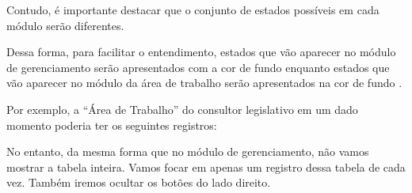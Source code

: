 \begin{landscape}
	Contudo, é importante destacar que o conjunto de estados possíveis em cada módulo serão diferentes.
	
	Dessa forma, para facilitar o entendimento, estados que vão aparecer no módulo de gerenciamento serão apresentados com a cor de fundo  enquanto estados que vão aparecer no módulo da área de trabalho serão apresentados na cor de fundo .	
	
	\pagebreak
	
	Por exemplo, a ``Área de Trabalho'' do consultor legislativo \EU em um dado momento poderia ter os seguintes registros:

	\begin{center}
	\end{center}

	No entanto, da mesma forma que no módulo de gerenciamento, não vamos mostrar a tabela inteira. Vamos focar em apenas um registro dessa tabela de cada vez. Também iremos ocultar os botões do lado direito. 


\end{landscape}
